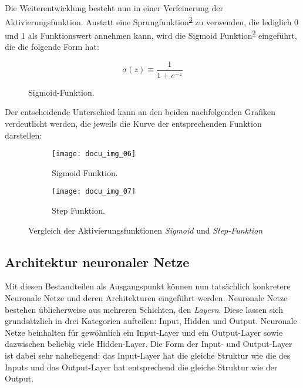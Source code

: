 Die Weiterentwicklung besteht nun in einer Verfeinerung der Aktivierungsfunktion. Anstatt eine Sprungfunktion\textsuperscript{\ref{fig:step-function}} zu verwenden, die lediglich 0 und 1 als Funktionswert annehmen kann, wird die Sigmoid Funktion\textsuperscript{\ref{fig:sigmoid-function}} eingeführt, die die folgende Form hat:

\begin{figure}[H]
    \centering
    \[ \sigma(z) \equiv
          \frac{1}{1+e^{-z}}
    \]
    \caption{Sigmoid-Funktion.}
    \label{fig:sigmoid}
\end{figure}

Der entscheidende Unterschied kann an den beiden nachfolgenden Grafiken verdeutlicht werden, die jeweils die Kurve der entsprechenden Funktion darstellen:

\captionsetup[subfigure]{labelformat=empty, labelsep=none}
\begin{figure}[H]
    \centering
    \begin{subfigure}{0.45\textwidth}
		\texttt{[image: docu\_img\_06]}
		\caption{\tiny{Sigmoid Funktion.}}
		\label{fig:sigmoid-function}
	\end{subfigure}
    \begin{subfigure}{0.45\textwidth}
		\texttt{[image: docu\_img\_07]}
		\caption{\tiny{Step Funktion.}}
		\label{fig:step-function}
	\end{subfigure}

    \caption{Vergleich der Aktivierungsfunktionen \textit{Sigmoid} und \textit{Step-Funktion}}
    \label{fig:activation-functions}
\end{figure}

\subsection{Architektur neuronaler Netze}

Mit diesen Bestandteilen als Ausgangspunkt können nun tatsächlich konkretere Neuronale Netze und deren Architekturen eingeführt werden. Neuronale Netze bestehen üblicherweise aus mehreren Schichten, den \textit{Layern}. Diese lassen sich grundsätzlich in drei Kategorien aufteilen: Input, Hidden und Output. Neuronale Netze beinhalten für gewöhnlich ein Input-Layer und ein Output-Layer sowie dazwischen beliebig viele Hidden-Layer. Die Form der Input- und Output-Layer ist dabei sehr naheliegend: das Input-Layer hat die gleiche Struktur wie die des Inputs und das Output-Layer hat entsprechend die gleiche Struktur wie der Output.

